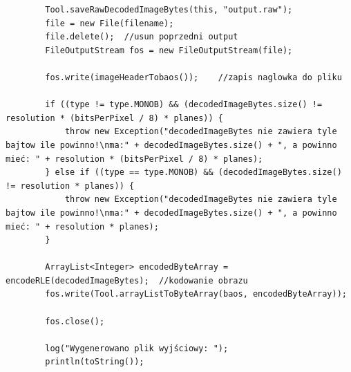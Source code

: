\documentclass{article}
\begin{document}
\begin{itemize}
\begin{verbatim}
        Tool.saveRawDecodedImageBytes(this, "output.raw");
        file = new File(filename);
        file.delete();  //usun poprzedni output
        FileOutputStream fos = new FileOutputStream(file);

        fos.write(imageHeaderTobaos());    //zapis naglowka do pliku

        if ((type != type.MONOB) && (decodedImageBytes.size() != resolution * (bitsPerPixel / 8) * planes)) {
            throw new Exception("decodedImageBytes nie zawiera tyle bajtow ile powinno!\nma:" + decodedImageBytes.size() + ", a powinno mieć: " + resolution * (bitsPerPixel / 8) * planes);
        } else if ((type == type.MONOB) && (decodedImageBytes.size() != resolution * planes)) {
            throw new Exception("decodedImageBytes nie zawiera tyle bajtow ile powinno!\nma:" + decodedImageBytes.size() + ", a powinno mieć: " + resolution * planes);
        }

        ArrayList<Integer> encodedByteArray = encodeRLE(decodedImageBytes);  //kodowanie obrazu
        fos.write(Tool.arrayListToByteArray(baos, encodedByteArray));

        fos.close();

        log("Wygenerowano plik wyjściowy: ");
        println(toString());


\end{verbatim}
\end{itemize}
\end{document}

